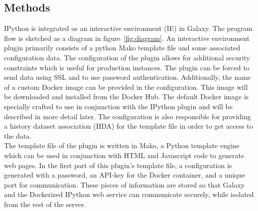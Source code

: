 \documentclass{bioinfo}
\begin{document}
\begin{methods}
\section{Methods}

IPython is integrated as an interactive environment (IE) in Galaxy. The program flow is sketched as a diagram in 
figure~\ref{fig:diagram}. An interactive environment plugin primarily consists of a python Mako template file and some
associated configuration data. The configuration of the plugin allows for additional security constraints which is useful
for production instances. The plugin can be forced to send data using SSL and to use password authentication.
Additionally, the name of a custom Docker image can be provided in the configuration. This image will be downloaded and 
installed from the Docker Hub. The default Docker image is specially crafted to use in conjunction with the IPython plugin
and will be described in more detail later. The configuration is also responsible for providing a history dataset 
association (HDA) for the template file in order to get access to the data. \\
The template file of the plugin is written in Mako, a Python template engine which can be used in conjunction with HTML
and Javascript code to generate web pages. In the first part of this plugin's template file, a configuration is generated with a password, 
an API-key for the Docker container, and a unique port for communication. These pieces of information are stored so that Galaxy
and the Dockerized IPython web service can communicate securely, while isolated from the rest of the server.


\end{methods}
\end{document}
